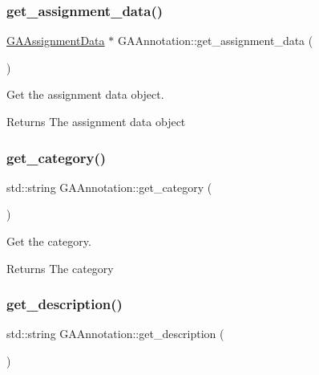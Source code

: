 \subsubsection{\texorpdfstring{get\+\_\+assignment\+\_\+data()}{get\_assignment\_data()}}
{\footnotesize\ttfamily \hyperlink{class_g_a_assignment_data}{G\+A\+Assignment\+Data} $\ast$ G\+A\+Annotation\+::get\+\_\+assignment\+\_\+data (\begin{DoxyParamCaption}{ }\end{DoxyParamCaption})}



Get the assignment data object. 

\begin{DoxyReturn}{Returns}
The assignment data object 
\end{DoxyReturn}
\mbox{\label{class_g_a_annotation_a2481b693d55c11c0066e6d708e7786e5}} 
\subsubsection{\texorpdfstring{get\+\_\+category()}{get\_category()}}
{\footnotesize\ttfamily std\+::string G\+A\+Annotation\+::get\+\_\+category (\begin{DoxyParamCaption}{ }\end{DoxyParamCaption})}



Get the category. 

\begin{DoxyReturn}{Returns}
The category 
\end{DoxyReturn}
\mbox{\label{class_g_a_annotation_a1e54b4980e080e1da0c40fe84443b650}} 
\subsubsection{\texorpdfstring{get\+\_\+description()}{get\_description()}}
{\footnotesize\ttfamily std\+::string G\+A\+Annotation\+::get\+\_\+description (\begin{DoxyParamCaption}{ }\end{DoxyParamCaption})}



